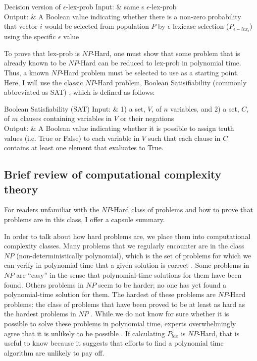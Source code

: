 \documentclass[sigconf]{acmart}
\begin{document}
\begin{problem}[ruled]{Decision version of $\epsilon$-lex-prob}
  Input: & same s {\sc $\epsilon$-lex-prob}\\
  Output: & A Boolean value indicating whether there is a non-zero probability that vector $i$ would be selected from population $P$ by $\epsilon$-lexicase selection ($P_{\epsilon-lex_i}$) using the specific $\epsilon$ value\\
\end{problem}

To prove that {\sc lex-prob} is $NP$-Hard, one must show that some problem that is already known to be $NP$-Hard can be reduced to {\sc lex-prob} in polynomial time. Thus, a known $NP$-Hard problem must be selected to use as a starting point. Here, I will use the classic $NP$-Hard problem, {\sc Boolean Satisifiability} (commonly abbreviated as {\sc SAT}) \citep{miller_reducibility_1972}, which is defined as follows:

\begin{problem}[ruled]{Boolean Satisfiability (SAT)}
  Input: & 1) a set, $V$, of $n$ variables, and 2) a set, $C$, of $m$ clauses containing variables in $V$ or their negations \\
  Output: & A Boolean value indicating whether it is possible to assign truth values (i.e. True or False) to each variable in $V$ such that each clause in $C$ contains at least one element that evaluates to True. \\
\end{problem}


\subsection{Brief review of computational complexity theory}

For readers unfamiliar with the $NP$-Hard class of problems and how to prove that problems are in this class, I offer a capsule summary. 

In order to talk about how hard problems are, we place them into computational complexity classes. Many problems that we regularly encounter are in the class $NP$ (non-deterministically polynomial), which is the set of problems for which we can verify in polynomial time that a given solution is correct \citep{miller_reducibility_1972}. Some problems in $NP$ are ``easy'' in the sense that polynomial-time solutions for them have been found. Others problems in $NP$ seem to be harder; no one has yet found a polynomial-time solution for them. The hardest of these problems are $NP$-Hard problems: the class of problems that have been proved to be at least as hard as the hardest problems in $NP$ \citep{cook_complexity_1971, miller_reducibility_1972}. While we do not know for sure whether it is possible to solve these problems in polynomial time, experts overwhelmingly agree that it is unlikely to be possible \citep{gasarch_guest_2019}.  If calculating $P_{lex}$ is $NP$-Hard, that is useful to know because it suggests that efforts to find a polynomial time algorithm are unlikely to pay off.
\end{document}
